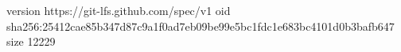 version https://git-lfs.github.com/spec/v1
oid sha256:25412cae85b347d87c9a1f0ad7eb09be99e5bc1fdc1e683bc4101d0b3bafb647
size 12229
